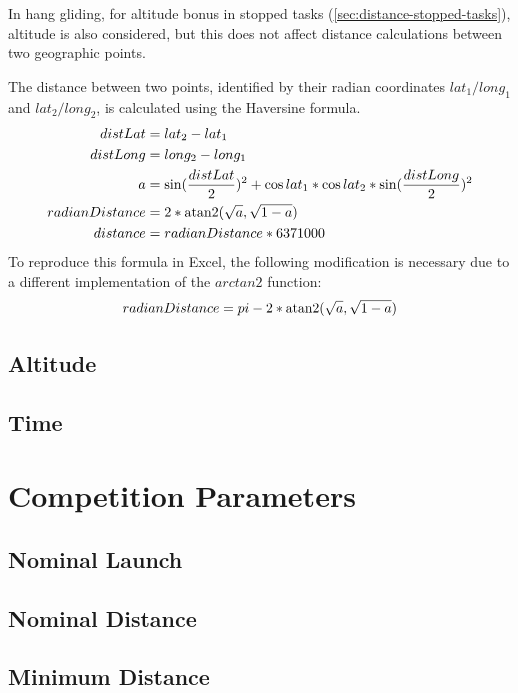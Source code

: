 \documentclass{article}
\begin{document}
\colorbox{hgc}{\begin{minipage}{\textwidth}
In hang gliding, for altitude bonus in stopped tasks (\ref{sec:distance-stopped-tasks}),
altitude is also considered, but this does not affect distance calculations between
two geographic points.
\end{minipage}}

The distance between two points, identified by their radian coordinates
\(lat_1/long_1\) and \(lat_2/long_2\), is calculated using the Haversine formula.
\begin{align*}
    distLat &= lat_2 - lat_1 \\
    distLong &= long_2 - long_1 \\
    a &= \sin(\frac{distLat}{2})^2 + \cos lat_1 * \cos lat_2 * \sin(\frac{distLong}{2})^2 \\
    radianDistance &= 2 * \operatorname{atan2}(\sqrt a, \sqrt{1 - a}) \\
    distance &= radianDistance * 6371000 \\
\end{align*}
To reproduce this formula in Excel, the following modification is necessary due to a different
implementation of the \(arctan2\) function:
\[ radianDistance = pi - 2 * \operatorname{atan2}(\sqrt a, \sqrt{1 - a}) \]

\subsection{Altitude}
\subsection{Time}

\newpage
\section{Competition Parameters}
\subsection{Nominal Launch}
\subsection{Nominal Distance}
\subsection{Minimum Distance}
\end{document}
